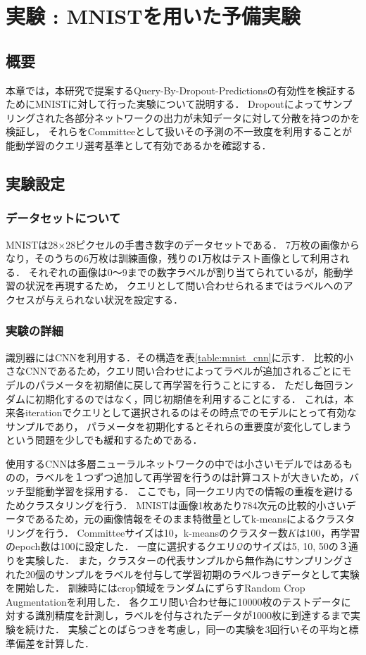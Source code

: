 \chapter{実験 : MNISTを用いた予備実験}

\section{概要}
本章では，本研究で提案するQuery-By-Dropout-Predictionsの有効性を検証するためにMNISTに対して行った実験について説明する．
Dropoutによってサンプリングされた各部分ネットワークの出力が未知データに対して分散を持つのかを検証し，
それらをCommitteeとして扱いその予測の不一致度を利用することが能動学習のクエリ選考基準として有効であるかを確認する．


\section{実験設定}

\subsection{データセットについて}
MNISTは28×28ピクセルの手書き数字のデータセットである．
7万枚の画像からなり，そのうちの6万枚は訓練画像，残りの1万枚はテスト画像として利用される．
それぞれの画像は0〜9までの数字ラベルが割り当てられているが，能動学習の状況を再現するため，
クエリとして問い合わせられるまではラベルへのアクセスが与えられない状況を設定する．


\subsection{実験の詳細}

識別器にはCNNを利用する．その構造を表\ref{table:mnist_cnn}に示す．
比較的小さなCNNであるため，クエリ問い合わせによってラベルが追加されるごとにモデルのパラメータを初期値に戻して再学習を行うことにする．
ただし毎回ランダムに初期化するのではなく，同じ初期値を利用することにする．
これは，本来各iterationでクエリとして選択されるのはその時点でのモデルにとって有効なサンプルであり，
パラメータを初期化するとそれらの重要度が変化してしまうという問題を少しでも緩和するためである．

使用するCNNは多層ニューラルネットワークの中では小さいモデルではあるものの，ラベルを１つずつ追加して再学習を行うのは計算コストが大きいため，バッチ型能動学習を採用する．
ここでも，同一クエリ内での情報の重複を避けるためクラスタリングを行う．
MNISTは画像1枚あたり784次元の比較的小さいデータであるため，元の画像情報をそのまま特徴量としてk-meansによるクラスタリングを行う．
Committeeサイズは10，k-meansのクラスター数$K$は100，再学習のepoch数は100に設定した．
一度に選択するクエリ$\mathcal{Q}$のサイズは5, 10, 50の３通りを実験した．
また，クラスターの代表サンプルから無作為にサンプリングされた20個のサンプルをラベルを付与して学習初期のラベルつきデータとして実験を開始した．
訓練時にはcrop領域をランダムにずらすRandom Crop Augmentationを利用した．
各クエリ問い合わせ毎に10000枚のテストデータに対する識別精度を計測し，ラベルを付与されたデータが1000枚に到達するまで実験を続けた．
実験ごとのばらつきを考慮し，同一の実験を3回行いその平均と標準偏差を計算した．

